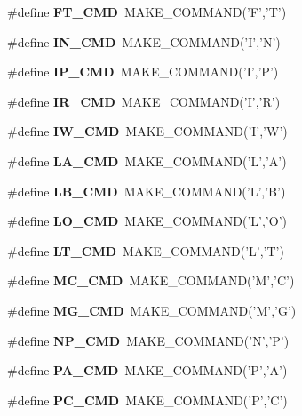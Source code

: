 \begin{DoxyCompactItemize}
\item 
\#define {\bfseries FT\_\-CMD}~MAKE\_\-COMMAND('F','T')\label{hpgsreader_8h_a88bf88ba2e8b7d6a7c508515864f4936}

\item 
\#define {\bfseries IN\_\-CMD}~MAKE\_\-COMMAND('I','N')\label{hpgsreader_8h_ae6d20bf287ebdfa2cf4264d10f4dad67}

\item 
\#define {\bfseries IP\_\-CMD}~MAKE\_\-COMMAND('I','P')\label{hpgsreader_8h_af435fa20a5e0578e5de7200790b6cedb}

\item 
\#define {\bfseries IR\_\-CMD}~MAKE\_\-COMMAND('I','R')\label{hpgsreader_8h_a3442212d2aaf4032596e65577223e353}

\item 
\#define {\bfseries IW\_\-CMD}~MAKE\_\-COMMAND('I','W')\label{hpgsreader_8h_a32d9b8ad9f11e5cfd42847e9359a0822}

\item 
\#define {\bfseries LA\_\-CMD}~MAKE\_\-COMMAND('L','A')\label{hpgsreader_8h_aa204b94ee83fba02e985379006fd1802}

\item 
\#define {\bfseries LB\_\-CMD}~MAKE\_\-COMMAND('L','B')\label{hpgsreader_8h_a367a50a3eb7a106d80484edc7192864b}

\item 
\#define {\bfseries LO\_\-CMD}~MAKE\_\-COMMAND('L','O')\label{hpgsreader_8h_a3ebc1b1470bdb90231fb4f77637e3168}

\item 
\#define {\bfseries LT\_\-CMD}~MAKE\_\-COMMAND('L','T')\label{hpgsreader_8h_ac69ac0b854f70d6f69622ef667fe2e87}

\item 
\#define {\bfseries MC\_\-CMD}~MAKE\_\-COMMAND('M','C')\label{hpgsreader_8h_a6ed94d30762f635b033570a05bad8944}

\item 
\#define {\bfseries MG\_\-CMD}~MAKE\_\-COMMAND('M','G')\label{hpgsreader_8h_a9c923deff4222b75a6dd50d625022cc4}

\item 
\#define {\bfseries NP\_\-CMD}~MAKE\_\-COMMAND('N','P')\label{hpgsreader_8h_aea5ed1063a8fce20aadfd44cb5f3dd1e}

\item 
\#define {\bfseries PA\_\-CMD}~MAKE\_\-COMMAND('P','A')\label{hpgsreader_8h_afbc14c1b74f8161aca374090231277b0}

\item 
\#define {\bfseries PC\_\-CMD}~MAKE\_\-COMMAND('P','C')\label{hpgsreader_8h_af51a57014af907d0618e6d44670632e5}


\end{DoxyCompactItemize}
